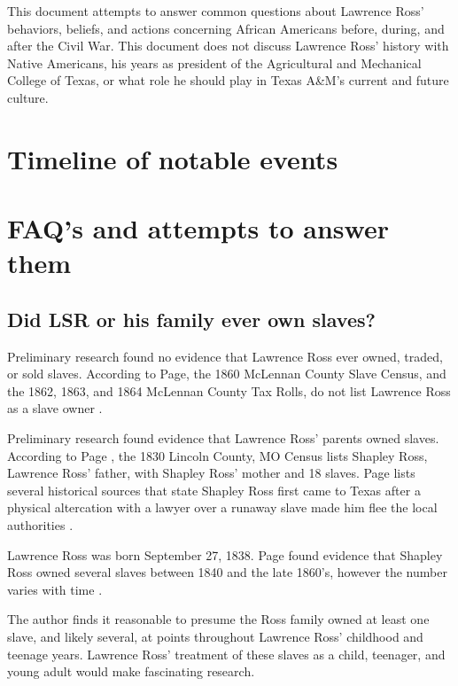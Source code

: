 \documentclass[12pt]{article}
\begin{document}
This document attempts to answer common questions about Lawrence Ross' behaviors, beliefs, and actions concerning African Americans before, during, and after the Civil War. This document does not discuss Lawrence Ross' history with Native Americans, his years as president of the Agricultural and Mechanical College of Texas, or what role he should play in Texas A\&M's current and future culture. 

\newpage
\section{Timeline of notable events}


\newpage
\section{FAQ's and attempts to answer them}

\subsection{Did LSR or his family ever own slaves? }
Preliminary research found no evidence that Lawrence Ross ever owned, traded, or sold slaves. According to Page, the 1860 McLennan County Slave Census, and the 1862, 1863, and 1864 McLennan County Tax Rolls, do not list Lawrence Ross as a slave owner \cite[pg.49]{page}.

Preliminary research found evidence that Lawrence Ross' parents owned slaves. According to Page \cite[pg.49]{page}, the 1830 Lincoln County, MO Census lists Shapley Ross, Lawrence Ross' father, with Shapley Ross' mother and 18 slaves. Page lists several historical sources that state Shapley Ross first came to Texas after a physical altercation with a lawyer over a runaway slave made him flee the local authorities \cite[pg.50--51]{page}. 

Lawrence Ross was born September 27, 1838. Page found evidence that Shapley Ross owned several slaves between 1840 and the late 1860's, however the number varies with time \cite[pg.51--55]{page}. 

The author finds it reasonable to presume the Ross family owned at least one slave, and likely several, at points throughout Lawrence Ross' childhood and teenage years. Lawrence Ross' treatment of these slaves as a child, teenager, and young adult would make fascinating research. 
\end{document}
